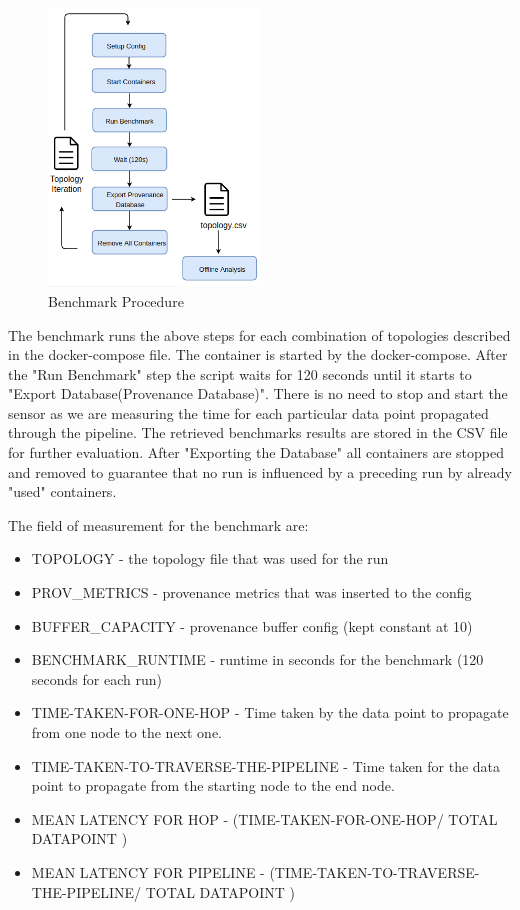 \begin{figure}[H]
	\center
	\includegraphics[width=0.5\textwidth]{figures/benchmark_latency.png}
	\caption{Benchmark Procedure}
	\label{fig:benchmark_latency}
\end{figure}

The benchmark runs the above steps for each combination of topologies described in the docker-compose file. The container is started by the docker-compose. After the "Run Benchmark" step the script waits for 120 seconds until it starts to "Export Database(Provenance Database)". There is no need to stop and start the sensor as we are measuring the time for each particular data point propagated through the pipeline. The retrieved benchmarks results are stored in the CSV file for further evaluation. After "Exporting the Database" all containers are stopped and removed to guarantee that no run is influenced by a preceding run by already "used" containers.

The field of measurement for the benchmark are:
\begin{itemize}
	\item TOPOLOGY - the topology file that was used for the run
	\item PROV\_METRICS - provenance metrics that was inserted to the config
	\item BUFFER\_CAPACITY - provenance buffer config (kept constant at 10)
	\item BENCHMARK\_RUNTIME - runtime in seconds for the benchmark (120 seconds for each run)
	\item TIME-TAKEN-FOR-ONE-HOP - Time taken by the data point to propagate from one node to the next one.
	\item TIME-TAKEN-TO-TRAVERSE-THE-PIPELINE - Time taken for the data point to propagate from the starting node to the end node.
	\item MEAN LATENCY FOR HOP - (TIME-TAKEN-FOR-ONE-HOP/ TOTAL DATAPOINT )
	\item MEAN LATENCY FOR PIPELINE - (TIME-TAKEN-TO-TRAVERSE-THE-PIPELINE/ TOTAL DATAPOINT )
\end{itemize}

